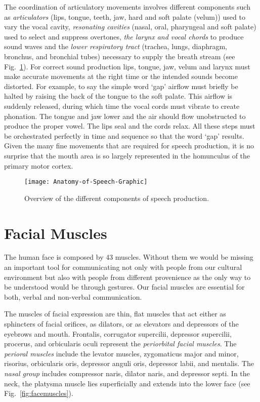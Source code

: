 The coordination of articulatory movements involves different components such as \textit{articulators} (lips, tongue, teeth, jaw, hard and soft palate (velum)) used to vary the vocal cavity, \textit{resonating cavities} (nasal, oral, pharyngeal and soft palate) used to select and suppress overtones, \textit{the larynx and vocal chords} to produce sound waves and the \textit{lower respiratory tract} (trachea, lungs, diaphragm, bronchus, and bronchial tubes) necessary to supply the breath stream (see Fig.~\ref{fig:speechmuscles})\cite{PhonManual}. 
For correct sound production lips, tongue, jaw, velum and larynx must make accurate movements at the right time or the intended sounds become distorted. For example, to say the simple word `gap' airflow must briefly be halted by raising the back of the tongue to the soft palate. This airflow is suddenly released, during which time the vocal cords must vibrate to create phonation. The tongue and jaw lower and the air should flow unobstructed to produce the proper vowel. The lips seal and the cords relax. All these steps must be orchestrated perfectly in time and sequence so that the word `gap' results. Given the many fine movements that are required for speech production, it is no surprise that the mouth area is so largely represented in the homunculus of the primary motor cortex.
 


\begin{figure}
    \centering
    \texttt{[image: Anatomy-of-Speech-Graphic]}
    \caption{Overview of the different components of speech production.}
    \label{fig:speechmuscles}
\end{figure}



\section{Facial Muscles}
\label{sec:anatomy}

The human face is composed by 43 muscles. Without them we would be missing an important tool for communicating not only with people from our cultural environment but also with people from different provenience as the only way to be understood would be through gestures. Our facial muscles are essential for both, verbal and non-verbal communication.\par 

The muscles of facial expression are thin, flat muscles that act either as sphincters of facial orifices, as dilators, or as elevators and depressors of the eyebrows and mouth. Frontalis, corrugator supercilii, depressor supercilii, procerus, and orbicularis oculi represent the \textit{periorbital facial muscles}. The \textit{perioral muscles} include the levator muscles, zygomaticus major and minor, risorius, orbicularis oris, depressor anguli oris, depressor labii, and mentalis. The \textit{nasal group} includes compressor naris, dilator naris, and depressor septi. In the neck, the platysma muscle lies superficially and extends into the lower face (see Fig.~\ref{fig:facemuscles}).\cite{Prendergast2013anatomy}


